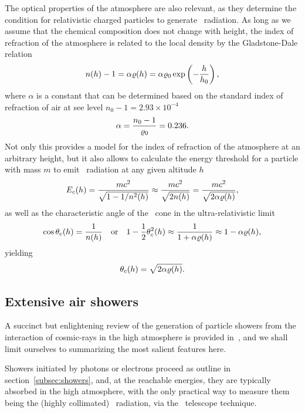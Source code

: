 The optical properties of the atmosphere are also relevant, as they determine the
condition for relativistic charged particles to generate \cherenkov~radiation.
As long as we assume that the chemical composition does not change with height,
the index of refraction of the atmosphere is related to the local density by the
Gladstone-Dale relation
\begin{align}
  n(h) - 1 = \alpha \varrho(h) = \alpha \varrho_0 \exp\left(-\frac{h}{h_0}\right),
\end{align}
where $\alpha$ is a constant that can be determined based on the standard index
of refraction of air at see level $n_0 - 1 = 2.93 \times 10^{-4}$
\begin{align*}
  \alpha = \frac{n_0 - 1}{\varrho_0} = 0.236.
\end{align*}
Not only this provides a model for the index of refraction of the atmosphere at
an arbitrary height, but it also allows to calculate the energy threshold
for a particle with mass $m$ to emit \cherenkov~radiation at any given altitude $h$
\begin{align}
  E_c(h) = \frac{mc^2}{\sqrt{1 - 1 / n^2(h)}} \approx \frac{mc^2}{\sqrt{2 n(h)}} =
  \frac{mc^2}{\sqrt{2 \alpha \varrho(h)}},
\end{align}
as well as the characteristic angle of the \cherenkov~cone in the ultra-relativistic
limit
\begin{align*}
  \cos\theta_c(h) = \frac{1}{n(h)}
  \quad\text{or}\quad
  1 - \frac{1}{2} \theta_c^2(h) \approx \frac{1}{1 + \alpha \varrho(h)}
  \approx 1 - \alpha \varrho(h),
\end{align*}
yielding
\begin{align}
  \theta_c(h) = \sqrt{2 \alpha \varrho(h)}.
\end{align}


\subsection{Extensive air showers}
\label{sec:eas}

A succinct but enlightening review of the generation of particle showers from the
interaction of cosmic-rays in the high atmosphere is provided in~\cite{2018PrPNP..98...85M},
and we shall limit ourselves to summarizing the most salient features here.

Showers initiated by photons or electrons proceed as outline in section~\ref{subsec:showers},
and, at the reachable energies, they are typically absorbed in the high atmosphere,
with the only practical way to measure them being the (highly collimated)
\cherenkov~radiation, via the \cherenkov~telescope technique.

